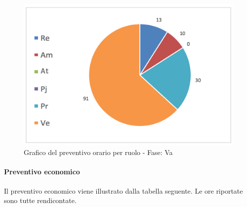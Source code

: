 			\begin{figure}[H]
			\centering
			\includegraphics[scale=0.32]{img/h_r_Va}
			\caption{Grafico del preventivo orario per ruolo - Fase: Va}
			\label{fig:Va"}
			\end{figure}

			\newpage
			\paragraph{Preventivo economico}
			Il preventivo economico viene illustrato dalla tabella seguente. Le ore riportate sono tutte rendicontate.\\


